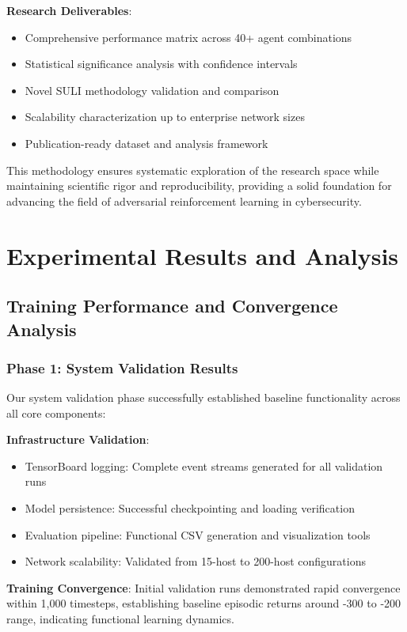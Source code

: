 \documentclass[11pt]{article}
\newcounter{phase}[algorithm]
\theoremstyle{definition}
\theoremstyle{plain}
\begin{document}
\textbf{Research Deliverables}:
\begin{itemize}
\item Comprehensive performance matrix across 40+ agent combinations
\item Statistical significance analysis with confidence intervals
\item Novel SULI methodology validation and comparison
\item Scalability characterization up to enterprise network sizes
\item Publication-ready dataset and analysis framework
\end{itemize}

This methodology ensures systematic exploration of the research space while maintaining scientific rigor and reproducibility, providing a solid foundation for advancing the field of adversarial reinforcement learning in cybersecurity.

\section{Experimental Results and Analysis}

\subsection{Training Performance and Convergence Analysis}

\subsubsection{Phase 1: System Validation Results}
Our system validation phase successfully established baseline functionality across all core components:

\textbf{Infrastructure Validation}:
\begin{itemize}
\item TensorBoard logging: Complete event streams generated for all validation runs
\item Model persistence: Successful checkpointing and loading verification
\item Evaluation pipeline: Functional CSV generation and visualization tools
\item Network scalability: Validated from 15-host to 200-host configurations
\end{itemize}

\textbf{Training Convergence}:
Initial validation runs demonstrated rapid convergence within 1,000 timesteps, establishing baseline episodic returns around -300 to -200 range, indicating functional learning dynamics.
\end{document}
